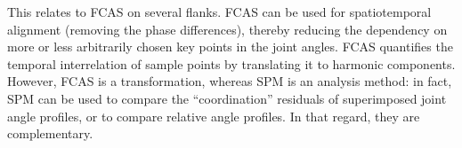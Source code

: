 \begin{change}
This relates to FCAS on several flanks.
FCAS can be used for spatiotemporal alignment (removing the phase differences), thereby reducing the dependency on more or less arbitrarily chosen key points in the joint angles.
FCAS quantifies the temporal interrelation of sample points by translating it to harmonic components.
However, FCAS is a transformation, whereas SPM is an analysis method: in fact, SPM can be used to compare the ``coordination'' residuals of superimposed joint angle profiles, or to compare relative angle profiles.
In that regard, they are complementary.
\end{change}
